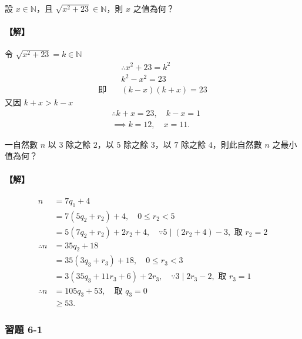 \begin{example}\label{ex:6-1-7}
設 $x \in \mathbb{N}$，且 $\sqrt{x^2+23} \in \mathbb{N}$，則 $x$ 之值為何？

\paragraph{【解】}
令 $\sqrt{x^2+23} = k \in \mathbb{N}$
\begin{align*}
  &\therefore x^2+23 = k^2 \\
  &k^2-x^2 = 23 \\
  \text{即} \quad &(k-x)(k+x) = 23
\end{align*}
又因 $k+x > k-x$
\begin{align*}
  &\therefore k+x = 23, \quad k-x = 1 \\
  &\implies k=12, \quad x=11.
\end{align*}
\end{example}

\begin{example}\label{ex:6-1-8}
一自然數 $n$ 以 $3$ 除之餘 $2$，以 $5$ 除之餘 $3$，以 $7$ 除之餘 $4$，則此自然數 $n$ 之最小值為何？

\paragraph{【解】}
\begin{align*}
  n &= 7q_1+4 \\
  &= 7(5q_2+r_2)+4, \quad 0 \le r_2 < 5 \\
  &= 5(7q_2+r_2)+2r_2+4, \quad \because 5 \mid (2r_2+4)-3, \text{ 取 } r_2=2 \\
  \therefore n &= 35q_2+18 \\
  &= 35(3q_3+r_3)+18, \quad 0 \le r_3 < 3 \\
  &= 3(35q_3+11r_3+6)+2r_3, \quad \because 3 \mid 2r_3-2, \text{ 取 } r_3=1 \\
  \therefore n &= 105q_3+53, \quad \text{取 } q_3=0 \\
  &\ge 53.
\end{align*}
\end{example}

\subsubsection*{習題 6-1}\label{sec:ex6-1}

